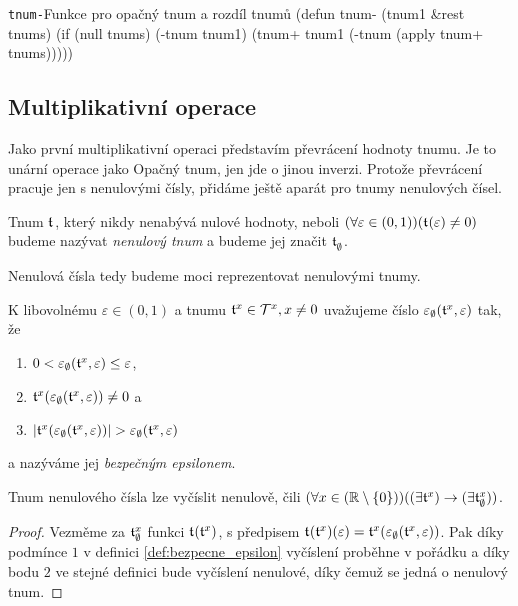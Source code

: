 \begin{lispcode}{\texttt{tnum-}}{Funkce pro opačný tnum a rozdíl tnumů}
(\textcolor{funkcionalni}{defun} \textcolor{pojmenovan}{tnum-} (tnum1 &rest tnums)
  (\textcolor{funkcionalni}{if} (\textcolor{funkcionalni}{null} tnums)
      (\textcolor{moje}{-tnum} tnum1)
    (\textcolor{moje}{tnum+} tnum1 (\textcolor{moje}{-tnum} (\textcolor{funkcionalni}{apply} \textquotesingle\textcolor{moje}{tnum+} tnums)))))
\end{lispcode}

\subsection{Multiplikativní operace}
Jako první multiplikativní operaci představím převrácení hodnoty tnumu. Je to unární operace jako Opačný tnum, jen jde o jinou inverzi. Protože převrácení pracuje jen s nenulovými čísly, přidáme ještě aparát pro tnumy nenulových čísel.

\begin{definition}
Tnum $\mathfrak{t}^{}$, který nikdy nenabývá nulové hodnoty, neboli $(\forall \varepsilon \in (0,1))(\mathfrak{t}^{}(\varepsilon) \neq 0)$ budeme nazývat \textit{nenulový tnum} a budeme jej značit $\mathfrak{t}^{}_\emptyset$.
\end{definition}

Nenulová čísla tedy budeme moci reprezentovat nenulovými tnumy.

\begin{definition}\label{def:bezpecne_epsilon}
K libovolnému $\varepsilon\in (0,1)$ a tnumu $\mathfrak{t}^{x}\in\mathcal{T}^{x}, x\neq 0$ uvažujeme číslo $\varepsilon_\emptyset(\mathfrak{t}^{x},\varepsilon)$ tak, že
\begin{enumerate}
\item{$0<\varepsilon_\emptyset(\mathfrak{t}^{x},\varepsilon)\leq\varepsilon$},
\item{$\mathfrak{t}^{x}(\varepsilon_\emptyset(\mathfrak{t}^{x},\varepsilon)) \neq 0$} a
\item{$|\mathfrak{t}^{x}(\varepsilon_\emptyset(\mathfrak{t}^{x},\varepsilon))| > \varepsilon_\emptyset(\mathfrak{t}^{x},\varepsilon)$}
\end{enumerate}
a nazýváme jej \textit{bezpečným epsilonem}.
\end{definition}

\begin{lemma}\label{vet:nenul}
Tnum nenulového čísla lze vyčíslit nenulově, čili $(\forall x \in(\mathbb{R}\setminus\{0\}))((\exists \mathfrak{t}^{x}) \rightarrow (\exists \mathfrak{t}^{x}_\emptyset))$. 
\begin{proof}
Vezměme za $\mathfrak{t}^{x}_\emptyset$ funkci $\mathfrak{t}^{}(\mathfrak{t}^{x})$, s předpisem $\mathfrak{t}^{}(\mathfrak{t}^{x})(\varepsilon) = \mathfrak{t}^{x}(\varepsilon_\emptyset(\mathfrak{t}^{x},\varepsilon))$. Pak díky podmínce $1$ v definici \ref{def:bezpecne_epsilon} vyčíslení proběhne v pořádku a díky bodu $2$ ve stejné definici bude vyčíslení nenulové, díky čemuž se jedná o nenulový tnum.
\end{proof}
\end{lemma}

